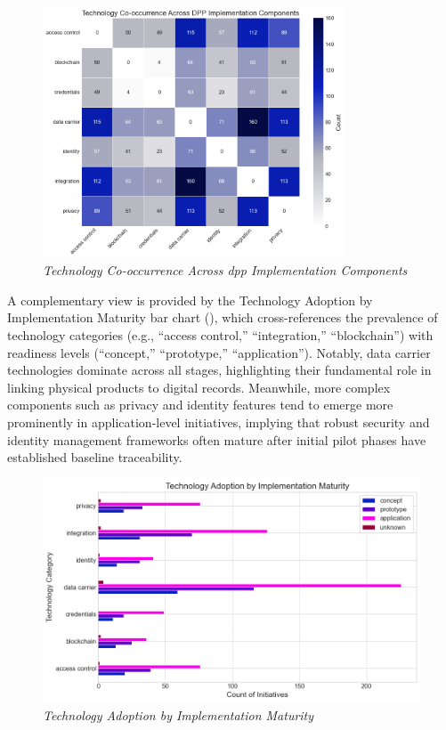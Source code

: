 \begin{figure}[htbp]
  \centering
  \includegraphics[width=0.8\textwidth]{figures/initiatives_tech_cooccurrence.png}
  \caption{%
    \textit{Technology Co-occurrence Across \ac{dpp} Implementation Components} 
  }
  \label{fig:initiatives_tech_cooccurrence}
\end{figure}

A complementary view is provided by the Technology Adoption by Implementation Maturity bar chart (), which cross-references the prevalence of technology categories (e.g., “access control,” “integration,” “blockchain”) with readiness levels (“concept,” “prototype,” “application”). Notably, data carrier technologies dominate across all stages, highlighting their fundamental role in linking physical products to digital records. Meanwhile, more complex components such as privacy and identity features tend to emerge more prominently in application-level initiatives, implying that robust security and identity management frameworks often mature after initial pilot phases have established baseline traceability.

\begin{figure}[htbp]
  \centering
  \vspace{-10pt}
  \includegraphics[width=\textwidth]{figures/initiatives_tech_adoption_by_maturity.png}
  \vspace{-10pt}
  \caption{%
    \textit{Technology Adoption by Implementation Maturity} 
  }
  \label{fig:initiatives_tech_adoption_by_maturity}
\end{figure}

